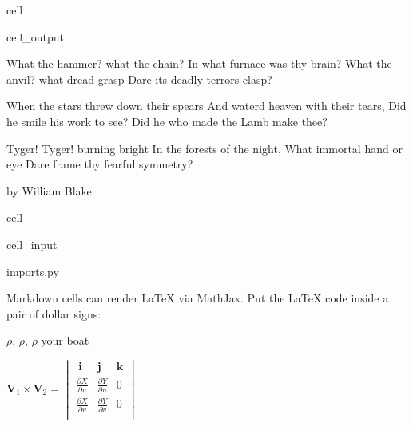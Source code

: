 \documentclass[letterpaper,10pt,english]{jupyterBook}
\begin{document}
\begin{sphinxuseclass}{cell}
\begin{sphinxVerbatimOutput}
\begin{sphinxuseclass}{cell_output}
\begin{sphinxVerbatim}[commandchars=\\\{\}]
What the hammer? what the chain?
In what furnace was thy brain?
What the anvil? what dread grasp
Dare its deadly terrors clasp?

When the stars threw down their spears
And water\PYGZsq{}d heaven with their tears,
Did he smile his work to see?
Did he who made the Lamb make thee?

Tyger! Tyger! burning bright
In the forests of the night,
What immortal hand or eye
Dare frame thy fearful symmetry?

                    by William Blake
\end{sphinxVerbatim}

\end{sphinxuseclass}\end{sphinxVerbatimOutput}

\end{sphinxuseclass}
\begin{sphinxuseclass}{cell}\begin{sphinxVerbatimInput}

\begin{sphinxuseclass}{cell_input}
\begin{sphinxVerbatim}[commandchars=\\\{\}]
 imports.py
\end{sphinxVerbatim}

\end{sphinxuseclass}\end{sphinxVerbatimInput}

\end{sphinxuseclass}
\begin{DUlineblock}{0em}
\item[] 
\end{DUlineblock}

\sphinxAtStartPar
Markdown cells can render LaTeX via MathJax. Put the LaTeX code inside a pair of dollar signs: 

\sphinxAtStartPar
\(\rho\), \(\rho\), \(\rho\) your boat

\sphinxAtStartPar
\(\mathbf{V}_1 \times \mathbf{V}_2 =  \begin{vmatrix} \
\mathbf{i} & \mathbf{j} & \mathbf{k}  \\
\frac{\partial X}{\partial u} & \frac{\partial Y}{\partial u} & 0\\
\frac{\partial X}{\partial v} & \frac{\partial Y}{\partial v} & 0\\
\end{vmatrix}\)
\end{document}
